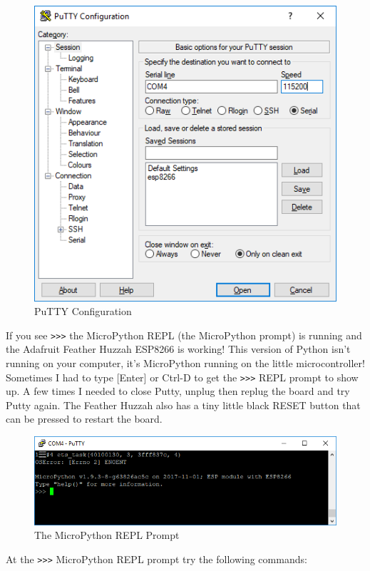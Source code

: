 \documentclass{book}
\makeatletter
\def\maxwidth{\ifdim\Gin@nat@width>\linewidth\linewidth
    \else\Gin@nat@width\fi}
\let\Oldincludegraphics\includegraphics
\renewcommand{\includegraphics}[1]{\Oldincludegraphics[width=.8\maxwidth]{#1}}
\makeatother
\begin{document}
\begin{figure}
\centering
\includegraphics{images/putty_config.PNG}
\caption{PuTTY Configuration}
\end{figure}

If you see \lstinline!>>>! the MicroPython REPL (the MicroPython prompt)
is running and the Adafruit Feather Huzzah ESP8266 is working! This
version of Python isn't running on your computer, it's MicroPython
running on the little microcontroller! Sometimes I had to type
{[}Enter{]} or Ctrl-D to get the \lstinline!>>>! REPL prompt to show up.
A few times I needed to close Putty, unplug then replug the board and
try Putty again. The Feather Huzzah also has a tiny little black RESET
button that can be pressed to restart the board.

\begin{figure}
\centering
\includegraphics{images/REPL_prompt.PNG}
\caption{The MicroPython REPL Prompt}
\end{figure}

At the \lstinline!>>>! MicroPython REPL prompt try the following
commands:
\end{document}
